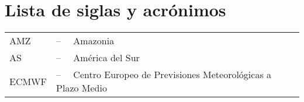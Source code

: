 \chapter*{\hfill{\centering Lista de siglas y acrónimos}\hfill}
\vspace{0.5cm}
\normalsize

\begin{tabular}{ll}
AMZ     &--$\quad$  Amazonia \\
AS      &--$\quad$  América del Sur \\
ECMWF   &--$\quad$  Centro Europeo de Previsiones Meteorológicas a Plazo Medio \\
\end{tabular}
